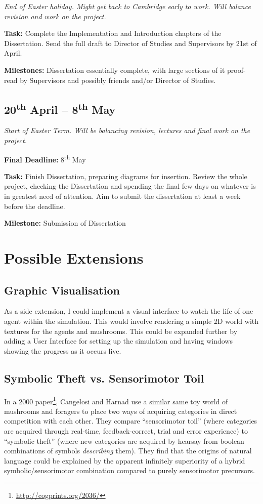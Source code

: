 \documentclass[12pt]{article}
\newcommand{\sups}{\textsuperscript}
\begin{document}
\emph{End of Easter holiday. Might get back to Cambridge early to work. Will balance revision and work on the project.}

{\bf Task:} Complete the Implementation and Introduction chapters of the Dissertation. Send the full draft to Director of Studies and Supervisors by 21st of April.

{\bf Milestones:} Dissertation essentially complete, with large sections of it proof-read by Supervisors and possibly friends and/or Director of Studies.

\subsection*{20\sups{th} April -- 8\sups{th} May}

\emph{Start of Easter Term. Will be balancing revision, lectures and final work on the project.}

{\bf Final Deadline:} 8\sups{th} May

{\bf Task:} Finish Dissertation, preparing diagrams for insertion. Review the whole project, checking the Dissertation and spending the final few days on whatever is in greatest need of attention. Aim to submit the dissertation at least a week before the deadline.

{\bf Milestone:} Submission of Dissertation

\section*{Possible Extensions}

\subsection*{Graphic Visualisation}

As a side extension, I could implement a visual interface to watch the life of one agent within the simulation. This would involve rendering a simple 2D world with textures for the agents and mushrooms. This could be expanded further by adding a User Interface for setting up the simulation and having windows showing the progress as it occurs live.

\subsection*{Symbolic Theft vs. Sensorimotor Toil}

In a 2000 paper\footnote{\url{http://cogprints.org/2036/}}, Cangelosi and Harnad use a similar same toy world of mushrooms and foragers to place two ways of acquiring categories in direct competition with each other. They compare ``sensorimotor toil'' (where categories are acquired through real-time, feedback-correct, trial and error experience) to ``symbolic theft'' (where new categories are acquired by hearsay from boolean combinations of symbols \emph{describing} them). They find that the origins of natural language could be explained by the apparent infinitely superiority of a hybrid symbolic/sensorimotor combination compared to purely sensorimotor precursors. 
\end{document}
